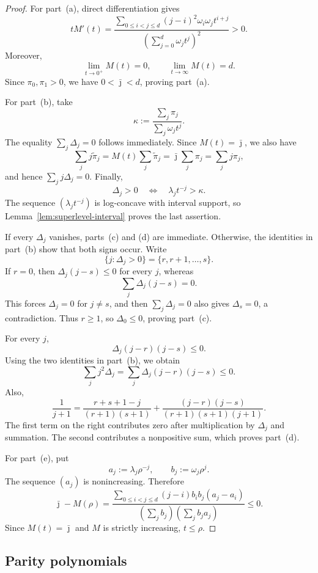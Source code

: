 \documentclass[12pt]{amsart}
\theoremstyle{plain}
\theoremstyle{definition}
\theoremstyle{remark}
\begin{document}
\begin{proof}
For part~\textup{(a)}, direct differentiation gives
\[
 tM'(t)
 =
 \frac{
 \displaystyle
 \sum_{0\le i<j\le d}
 (j-i)^2\omega_i\omega_jt^{i+j}}
 {\left(\sum_{j=0}^d\omega_jt^j\right)^2}
 >0.
\]
Moreover,
\[
 \lim_{t\to0^+}M(t)=0,
 \qquad
 \lim_{t\to\infty}M(t)=d.
\]
Since \(\pi_0,\pi_1>0\), we have \(0<\bar\jmath<d\), proving
part~\textup{(a)}.

For part~\textup{(b)}, take
\[
 \kappa:=
 \frac{\sum_j\pi_j}{\sum_j\omega_jt^j}.
\]
The equality \(\sum_j\Delta_j=0\) follows immediately.  Since
\(M(t)=\bar\jmath\), we also have
\[
 \sum_jj\widetilde\pi_j
 =M(t)\sum_j\widetilde\pi_j
 =\bar\jmath\sum_j\pi_j
 =\sum_jj\pi_j,
\]
and hence \(\sum_jj\Delta_j=0\).  Finally,
\[
 \Delta_j>0
 \quad\Longleftrightarrow\quad
 \lambda_jt^{-j}>\kappa.
\]
The sequence \((\lambda_jt^{-j})\) is log-concave with interval support,
so Lemma~\ref{lem:superlevel-interval} proves the last assertion.

If every \(\Delta_j\) vanishes, parts~\textup{(c)} and \textup{(d)} are
immediate.  Otherwise, the identities in part~\textup{(b)} show that
both signs occur.  Write
\[
 \{j:\Delta_j>0\}=\{r,r+1,\ldots,s\}.
\]
If \(r=0\), then \(\Delta_j(j-s)\le0\) for every \(j\), whereas
\[
 \sum_j\Delta_j(j-s)=0.
\]
This forces \(\Delta_j=0\) for \(j\ne s\), and then
\(\sum_j\Delta_j=0\) also gives \(\Delta_s=0\), a contradiction.  Thus
\(r\ge1\), so \(\Delta_0\le0\), proving part~\textup{(c)}.

For every \(j\),
\[
 \Delta_j(j-r)(j-s)\le0.
\]
Using the two identities in part~\textup{(b)}, we obtain
\[
 \sum_jj^2\Delta_j
 =
 \sum_j\Delta_j(j-r)(j-s)
 \le0.
\]
Also,
\[
 \frac1{j+1}
 =
 \frac{r+s+1-j}{(r+1)(s+1)}
 +
 \frac{(j-r)(j-s)}
 {(r+1)(s+1)(j+1)}.
\]
The first term on the right contributes zero after multiplication by
\(\Delta_j\) and summation.  The second contributes a nonpositive sum,
which proves part~\textup{(d)}.

For part~\textup{(e)}, put
\[
 a_j:=\lambda_j\rho^{-j},
 \qquad
 b_j:=\omega_j\rho^j.
\]
The sequence \((a_j)\) is nonincreasing.  Therefore
\[
 \bar\jmath-M(\rho)
 =
 \frac{
 \displaystyle
 \sum_{0\le i<j\le d}
 (j-i)b_ib_j(a_j-a_i)}
 {\left(\sum_jb_j\right)\left(\sum_jb_ja_j\right)}
 \le0.
\]
Since \(M(t)=\bar\jmath\) and \(M\) is strictly increasing, \(t\le\rho\).
\end{proof}

\subsection{Parity polynomials}
\end{document}
